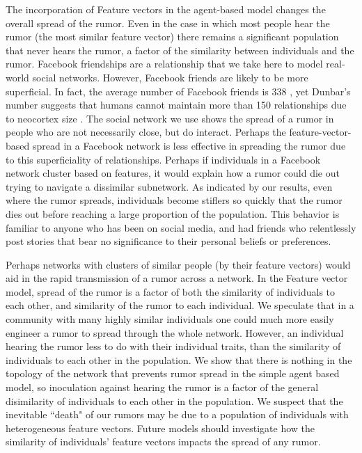The incorporation of Feature vectors in the agent-based model changes the overall spread of the rumor. Even in the case in which most people hear the rumor (the most similar feature vector) there remains a significant population that never hears the rumor, a factor of the similarity between individuals and the rumor. Facebook friendships are a relationship that we take here to model real-world social networks. However, Facebook friends are likely to be more superficial. In fact, the average number of Facebook friends is 338 \cite{smith-2014}, yet Dunbar's number suggests that humans cannot maintain more than 150 relationships due to neocortex size \cite{dunbar-1992}. The social network we use shows the spread of a rumor in people who are not necessarily close, but do interact. Perhaps the feature-vector-based spread in a Facebook network is less effective in spreading the rumor due to this superficiality of relationships. Perhaps if individuals in a Facebook network cluster based on features, it would explain how a rumor could die out trying to navigate a dissimilar subnetwork. As indicated by our results, even where the rumor spreads, individuals become stiflers so quickly that the rumor dies out before reaching a large proportion of the population. This behavior is familiar to anyone who has been on social media, and had friends who relentlessly post stories that bear no significance to their personal beliefs or preferences.

Perhaps networks with clusters of similar people (by their feature vectors) would aid in the rapid transmission of a rumor across a network. In the Feature vector model, spread of the rumor is a factor of both the similarity of individuals to each other, and similarity of the rumor to each individual. We speculate that in a community with many highly similar individuals one could much more easily engineer a rumor to spread through the whole network. However, an individual hearing the rumor less to do with their individual traits, than the similarity of individuals to each other in the population. We show that there is nothing in the topology of the network that prevents rumor spread in the simple agent based model, so inoculation against hearing the rumor is a factor of the general disimilarity of individuals to each other in the population. We suspect that the inevitable ``death" of our rumors may be due to a population of individuals with heterogeneous feature vectors. Future models should investigate how the similarity of individuals' feature vectors impacts the spread of any rumor. 

